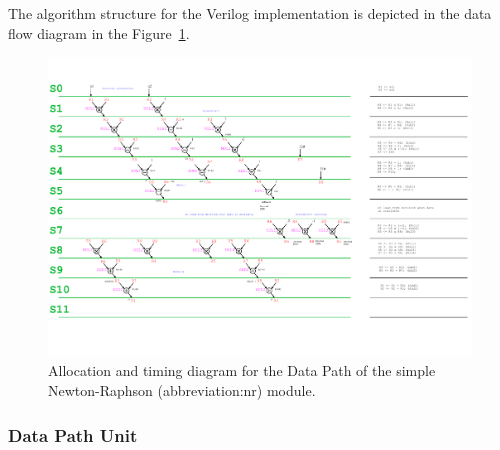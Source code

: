 \documentclass[a4paper, twoside, 11pt]{article}
\newcommand{\fbar}{\FloatBarrier}
\begin{document}
            The algorithm structure for the Verilog implementation is depicted in the data flow diagram in the Figure~\ref{fig:simple-nr-allocation-timing}.
            \begin{figure}[htbp!]
                \centering
                \includegraphics[width=1\textwidth]{src/pdf/simple-nr-allocation-timing.pdf}
                \caption{Allocation and timing diagram for the Data Path of the simple Newton-Raphson (\gls{abbreviation:nr}) module.}
                \label{fig:simple-nr-allocation-timing}
            \end{figure}

        \fbar
        \subsubsection{Data Path Unit}
\end{document}
